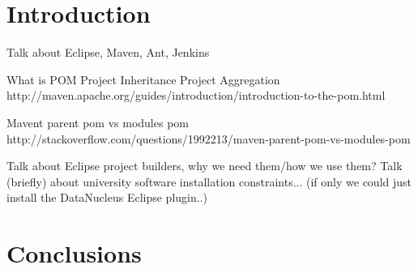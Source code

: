 \documentclass[12pt]{article}
\begin{document}
\maketitle
\section{Introduction}
Talk about Eclipse, Maven, Ant, Jenkins

What is POM
Project Inheritance
Project Aggregation
http://maven.apache.org/guides/introduction/introduction-to-the-pom.html

Mavent parent pom vs modules pom
http://stackoverflow.com/questions/1992213/maven-parent-pom-vs-modules-pom

Talk about Eclipse project builders, why we need them/how we use them? %
Talk (briefly) about university software installation constraints... (if only we could just install the DataNucleus Eclipse plugin..)

\section{Conclusions}
\end{document}
